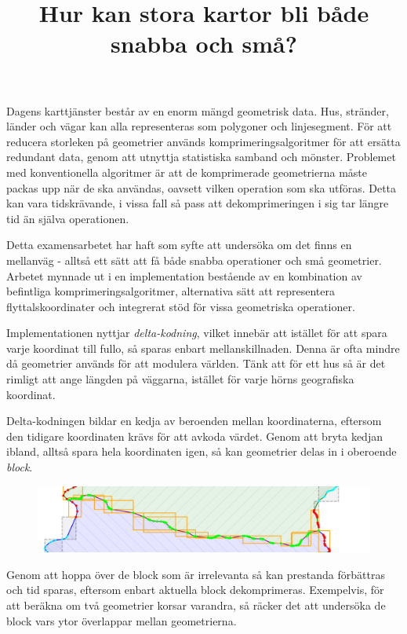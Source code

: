 \documentclass{popsci}
\title{Hur kan stora kartor bli både snabba och små?}
\begin{document}




{\noindent Dagens karttjänster består av en enorm mängd geometrisk data. Hus, stränder, länder och \mbox{vägar} kan alla representeras som polygoner och linjesegment. För att reducera storleken på geometrier används  komprimeringsalgoritmer för att ersätta redundant data, genom att \mbox{utnyttja} \mbox{statistiska} samband och mönster. \mbox{Problemet} med \mbox{konventionella} algoritmer är att de komprimerade \mbox{geometrierna} måste packas upp när de ska användas, oavsett vilken operation som ska \mbox{utföras}. Detta kan vara tidskrävande, i vissa fall så pass att \mbox{dekomprimeringen} i sig tar längre tid än själva \mbox{operationen}.

Detta examensarbetet har haft som syfte att undersöka om det finns en mellanväg - alltså ett sätt att få både snabba operationer och små geometrier. Arbetet mynnade ut i en implementation bestående av en kombination av befintliga komprimeringsalgoritmer, alternativa sätt att representera flyttalskoordinater och integrerat stöd för vissa geometriska operationer.

Implementationen nyttjar \emph{delta-kodning}, vilket innebär att istället för att spara varje koordinat till fullo, så sparas enbart mellanskillnaden. Denna är ofta mindre då geometrier används för att modulera världen. Tänk att för ett hus så är det rimligt att ange längden på väggarna, istället för varje hörns geografiska koordinat.

Delta-kodningen bildar en kedja av beroenden mellan koordinaterna, eftersom den tidigare \mbox{koordinaten} krävs för att avkoda värdet. Genom att bryta kedjan ibland, alltså spara hela koordinaten igen, så kan geometrier delas in i oberoende \emph{block}. 


\begin{figure}[!bth] %
\includegraphics[width=\columnwidth]{images/popvet.png} 
\end{figure}
Genom att hoppa över de block som är irrelevanta så kan prestanda förbättras och tid sparas, eftersom enbart aktuella block dekomprimeras. Exempelvis, för att beräkna om två geometrier korsar varandra, så räcker det att undersöka de block vars ytor \mbox{överlappar} mellan geometrierna. 

}
\end{document}
